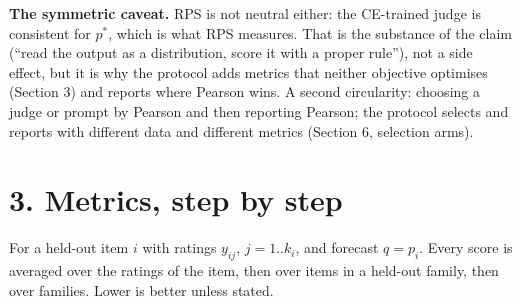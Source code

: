 \documentclass[10.5pt]{article}
\begin{document}
\textbf{The symmetric caveat.} RPS is not neutral either: the CE-trained judge is consistent for $p^\ast$, which is what RPS measures. That is the substance of the claim (``read the output as a distribution, score it with a proper rule''), not a side effect, but it is why the protocol adds metrics that neither objective optimises (Section 3) and reports where Pearson wins. A second circularity: choosing a judge or prompt by Pearson and then reporting Pearson; the protocol selects and reports with different data and different metrics (Section 6, selection arms).

\section*{3. Metrics, step by step}
For a held-out item $i$ with ratings $y_{ij}$, $j=1..k_i$, and forecast $q=p_i$. Every score is averaged over the ratings of the item, then over items in a held-out family, then over families. Lower is better unless stated.
\end{document}
